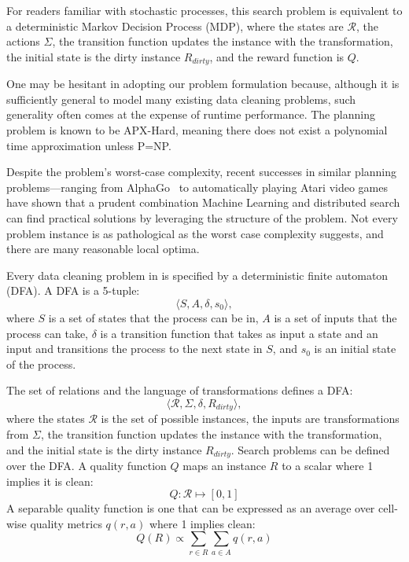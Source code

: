 For readers familiar with stochastic processes, this search problem is equivalent to a deterministic Markov Decision Process (MDP), where the states are $\mathcal{R}$, the actions $\Sigma$, the transition function updates the instance with the transformation, the initial state is the dirty instance $R_{dirty}$, and the reward function is $Q$.

One may be hesitant in adopting our problem formulation because, although it is sufficiently general to model many existing data cleaning problems, such generality often comes at the expense of runtime performance.   The planning problem is known to be APX-Hard, meaning there does not exist a polynomial time approximation unless P=NP.  

Despite the problem's worst-case complexity, 
recent successes in similar planning problems---ranging from AlphaGo~\cite{silver2016mastering} to automatically playing Atari video games~\cite{mnih2015human} have shown that a prudent combination Machine Learning and distributed search can find practical solutions by leveraging the structure of the problem. 
Not every problem instance is as pathological as the worst case complexity suggests, and there are many reasonable local optima.









    Every data cleaning problem in \sys is specified by a deterministic finite automaton (DFA). 
    A DFA is a 5-tuple:
    \[\langle S, A, \delta, s_0\rangle,\]
    where $S$ is a set of states that the process can be in, $A$ is a set of inputs that the process can take, $\delta$ is a transition function that takes as input a state and an input and transitions the process to the next state in $S$, and $s_0$ is an initial state of the process.

    The set of relations and the language of transformations defines a DFA:
    \[\langle \mathcal{R}, \Sigma, \delta, R_{dirty}\rangle, \]
    where the states $\mathcal{R}$ is the set of possible instances, the inputs are transformations from $\Sigma$, the transition function updates the instance with the transformation, and the initial state is the dirty instance $R_{dirty}$. Search problems can be defined over the DFA. 
    A quality function $Q$ maps an instance $R$ to a scalar where 1 implies it is clean:
    \[
    Q: \mathcal{R} \mapsto [0,1]
    \]
    A separable quality function is one that can be expressed as an average over cell-wise quality metrics $q(r,a)$ where 1 implies clean:
    \[
    Q(R) \propto \sum_{r \in R} \sum_{a \in A} q(r,a)
    \]


